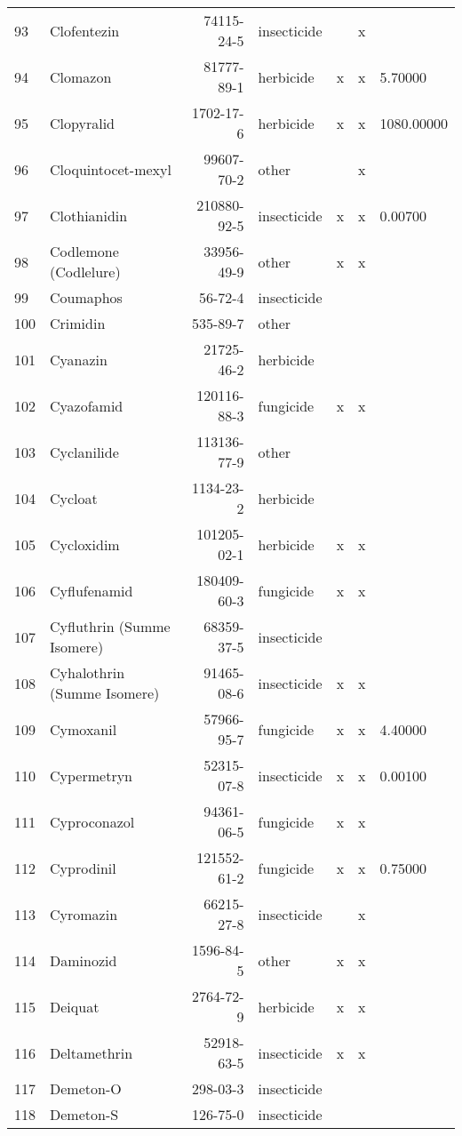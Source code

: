 \begin{longtable}{lp{3cm}rlp{1cm}p{1cm}p{1.5cm}}
  93 & Clofentezin & 74115-24-5 & insecticide &  & x &  \\ 
  94 & Clomazon & 81777-89-1 & herbicide & x & x & 5.70000 \\ 
  95 & Clopyralid & 1702-17-6 & herbicide & x & x & 1080.00000 \\ 
  96 & Cloquintocet-mexyl & 99607-70-2 & other &  & x &  \\ 
  97 & Clothianidin & 210880-92-5 & insecticide & x & x & 0.00700 \\ 
  98 & Codlemone (Codlelure) & 33956-49-9 & other & x & x &  \\ 
  99 & Coumaphos & 56-72-4 & insecticide &  &  &  \\ 
  100 & Crimidin & 535-89-7 & other &  &  &  \\ 
  101 & Cyanazin & 21725-46-2 & herbicide &  &  &  \\ 
  102 & Cyazofamid & 120116-88-3 & fungicide & x & x &  \\ 
  103 & Cyclanilide & 113136-77-9 & other &  &  &  \\ 
  104 & Cycloat & 1134-23-2 & herbicide &  &  &  \\ 
  105 & Cycloxidim & 101205-02-1 & herbicide & x & x &  \\ 
  106 & Cyflufenamid & 180409-60-3 & fungicide & x & x &  \\ 
  107 & Cyfluthrin (Summe Isomere) & 68359-37-5 & insecticide &  &  &  \\ 
  108 & Cyhalothrin (Summe Isomere) & 91465-08-6 & insecticide & x & x &  \\ 
  109 & Cymoxanil & 57966-95-7 & fungicide & x & x & 4.40000 \\ 
  110 & Cypermetryn & 52315-07-8 & insecticide & x & x & 0.00100 \\ 
  111 & Cyproconazol & 94361-06-5 & fungicide & x & x &  \\ 
  112 & Cyprodinil & 121552-61-2 & fungicide & x & x & 0.75000 \\ 
  113 & Cyromazin & 66215-27-8 & insecticide &  & x &  \\ 
  114 & Daminozid & 1596-84-5 & other & x & x &  \\ 
  115 & Deiquat & 2764-72-9 & herbicide & x & x &  \\ 
  116 & Deltamethrin & 52918-63-5 & insecticide & x & x &  \\ 
  117 & Demeton-O & 298-03-3 & insecticide &  &  &  \\ 
  118 & Demeton-S & 126-75-0 & insecticide &  &  &  \\ 

\end{longtable}
